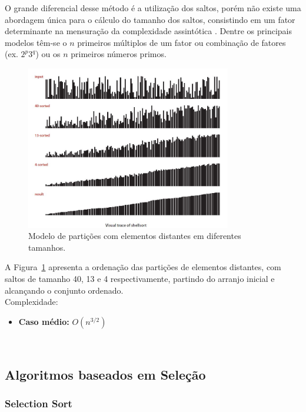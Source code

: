\documentclass[conference,onecolumn]{IEEEtran}
\begin{document}
O grande diferencial desse método é a utilização dos saltos, porém não existe uma abordagem única para o cálculo do tamanho dos saltos, consistindo em um fator determinante na mensuração da complexidade assintótica \cite{ziviani}. Dentre os principais modelos têm-se o $n$ primeiros múltiplos de um fator ou combinação de fatores (ex. $2^p3^q$) ou os $n$ primeiros números primos.

\begin{figure}[H]

  \centering
    \includegraphics[width=0.8\textwidth]{images/shell.jpg}
     \caption{Modelo de partições com elementos distantes em diferentes tamanhos.}
      \label{image:shell}
\end{figure}

A Figura~\ref{image:shell} apresenta a ordenação das partições de elementos distantes, com saltos de tamanho 40, 13 e 4 respectivamente, partindo do arranjo inicial e alcançando o conjunto ordenado.\\

Complexidade:
\begin{itemize}
\item \textbf{Caso médio:} $O (n^{3/2})$
\end{itemize}
~\\
\subsection{Algoritmos baseados em Seleção}


\subsubsection{Selection Sort}
\end{document}

